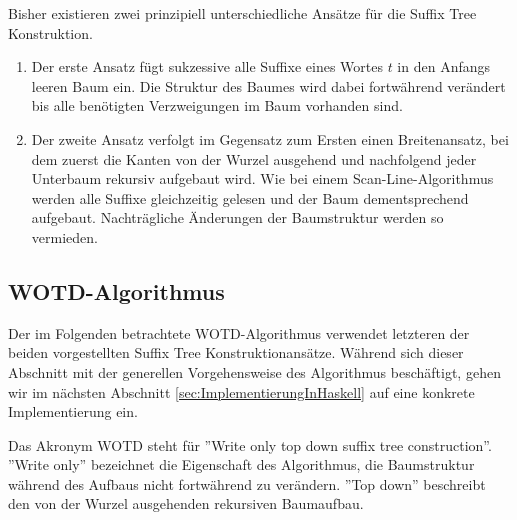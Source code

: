 \documentclass[12pt]{report}
\begin{document}
Bisher existieren zwei prinzipiell unterschiedliche Ansätze für die Suffix Tree Konstruktion.
\begin{enumerate}
     \item Der erste Ansatz fügt sukzessive alle Suffixe eines Wortes $t$ in den Anfangs leeren Baum ein. Die Struktur des Baumes wird dabei fortwährend verändert bis alle benötigten Verzweigungen im Baum vorhanden sind.
     \item Der zweite Ansatz verfolgt im Gegensatz zum Ersten einen Breitenansatz, bei dem zuerst die Kanten von der Wurzel ausgehend und nachfolgend jeder Unterbaum rekursiv aufgebaut wird. Wie bei einem Scan-Line-Algorithmus werden alle Suffixe gleichzeitig gelesen und der Baum dementsprechend aufgebaut. Nachträgliche Änderungen der Baumstruktur werden so vermieden.
 \end{enumerate}




\subsection{WOTD-Algorithmus}
\label{sec:WOTDAlgorithmus}

Der im Folgenden betrachtete WOTD-Algorithmus verwendet letzteren der beiden vorgestellten Suffix Tree Konstruktionansätze. Während sich dieser Abschnitt mit der generellen Vorgehensweise des Algorithmus beschäftigt, gehen wir im nächsten Abschnitt \ref{sec:ImplementierungInHaskell} auf eine konkrete Implementierung ein.

Das Akronym WOTD steht für ''Write only top down suffix tree construction''. ''Write only'' bezeichnet die Eigenschaft des Algorithmus, die Baumstruktur während des Aufbaus nicht fortwährend zu verändern. ''Top down'' beschreibt den von der Wurzel ausgehenden rekursiven Baumaufbau.
\end{document}
